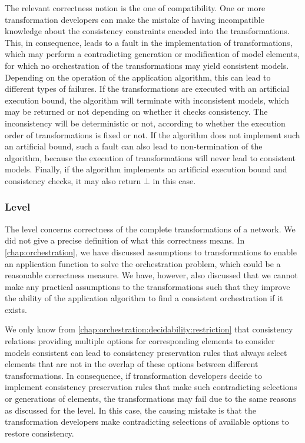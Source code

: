 The relevant correctness notion is the one of compatibility.
One or more transformation developers can make the mistake of having incompatible knowledge about the consistency constraints encoded into the transformations.
This, in consequence, leads to a fault in the implementation of transformations, which may perform a contradicting generation or modification of model elements, for which no orchestration of the transformations may yield consistent models.
Depending on the operation of the application algorithm, this can lead to different types of failures.
If the transformations are executed with an artificial execution bound, the algorithm will terminate with inconsistent models, which may be returned or not depending on whether it checks consistency.
The inconsistency will be deterministic or not, according to whether the execution order of transformations is fixed or not.
If the algorithm does not implement such an artificial bound, such a fault can also lead to non-termination of the algorithm, because the execution of transformations will never lead to consistent models.
Finally, if the algorithm implements an artificial execution bound and consistency checks, it may also return $\bot$ in this case.

\subsubsection*{\LevelNetworkRule Level}

The \levelnetworkrule level concerns correctness of the complete transformations of a network.
We did not give a precise definition of what this correctness means.
In \autoref{chap:orchestration}, we have discussed assumptions to transformations to enable an application function to solve the orchestration problem, which could be a reasonable correctness measure.
We have, however, also discussed that we cannot make any practical assumptions to the transformations such that they improve the ability of the application algorithm to find a consistent orchestration if it exists.

We only know from \autoref{chap:orchestration:decidability:restriction} that consistency relations providing multiple options for corresponding elements to consider models consistent can lead to consistency preservation rules that always select elements that are not in the overlap of these options between different transformations.
In consequence, if transformation developers decide to implement consistency preservation rules that make such contradicting selections or generations of elements, the transformations may fail due to the same reasons as discussed for the \levelnetworkrelation level.
In this case, the causing mistake is that the transformation developers make contradicting selections of available options to restore consistency.

